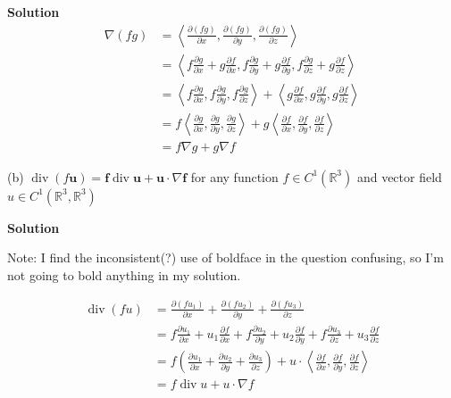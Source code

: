 \documentclass{article}
\begin{document}
\textbf{Solution}
%
\begin{align*}
    \nabla (f g)
        &= \left\langle
                \frac{\partial (f g)}{\partial x},
                \frac{\partial (f g)}{\partial y},
                \frac{\partial (f g)}{\partial z}
           \right\rangle \\
        &= \left\langle
                f \frac{\partial g}{\partial x} + g \frac{\partial f}{\partial x},
                f \frac{\partial g}{\partial y} + g \frac{\partial f}{\partial y},
                f \frac{\partial g}{\partial z} + g \frac{\partial f}{\partial z}
           \right\rangle \\
        &= \left\langle
                f \frac{\partial g}{\partial x},
                f \frac{\partial g}{\partial y},
                f \frac{\partial g}{\partial z}
           \right\rangle
           +
           \left\langle
                g \frac{\partial f}{\partial x},
                g \frac{\partial f}{\partial y},
                g \frac{\partial f}{\partial z}
           \right\rangle \\
        &= f \left\langle
                \frac{\partial g}{\partial x},
                \frac{\partial g}{\partial y},
                \frac{\partial g}{\partial z}
           \right\rangle
           +
           g \left\langle
                \frac{\partial f}{\partial x},
                \frac{\partial f}{\partial y},
                \frac{\partial f}{\partial z}
           \right\rangle \\
        &= f \nabla g + g \nabla f
\end{align*}

\vspace{5mm}
(b) $\operatorname{div}(f \mathbf{u}) = \mathbf{f} \operatorname{div} \mathbf{u} + \mathbf{u} \cdot \nabla \mathbf{f}$
for any function $f \in C^{1}\left(\mathbb{R}^{3}\right)$ and vector field
$u \in C^{1}\left(\mathbb{R}^{3}, \mathbb{R}^{3}\right)$

\textbf{Solution}

Note: I find the inconsistent(?) use of boldface in the question
confusing, so I'm not going to bold anything in my solution.

\begin{align*}
    \operatorname{div}(f u)
        &= \frac{\partial (f u_1)}{\partial x}
           + \frac{\partial (f u_2)}{\partial y}
           + \frac{\partial (f u_3)}{\partial z}
           \\
        &= f \frac{\partial u_1}{\partial x} + u_1 \frac{\partial f}{\partial x}
           + f \frac{\partial u_2}{\partial y} + u_2 \frac{\partial f}{\partial y}
           + f \frac{\partial u_3}{\partial z} + u_3 \frac{\partial f}{\partial z}
           \\
        &= f \left(
            \frac{\partial u_1}{\partial x}
            + \frac{\partial u_2}{\partial y}
            + \frac{\partial u_3}{\partial z}
           \right) +
           u \cdot \left\langle
                \frac{\partial f}{\partial x},
                \frac{\partial f}{\partial y},
                \frac{\partial f}{\partial z}
           \right\rangle \\
        &= f \operatorname{div} u + u \cdot \nabla f
\end{align*}
\end{document}
